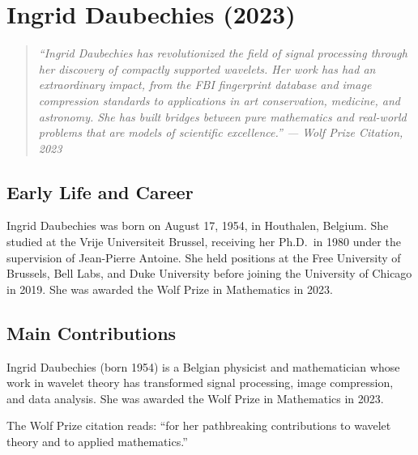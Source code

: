 \providecommand{\supp}{\operatorname{supp}}
\providecommand{\span}{\operatorname{span}}

\chapter{Ingrid Daubechies (2023)}

\begin{quote}
\it ``Ingrid Daubechies has revolutionized the field of signal processing through her discovery of compactly supported wavelets. Her work has had an extraordinary impact, from the FBI fingerprint database and image compression standards to applications in art conservation, medicine, and astronomy. She has built bridges between pure mathematics and real-world problems that are models of scientific excellence.'' --- Wolf Prize Citation, 2023
\end{quote}

\section{Early Life and Career}

Ingrid Daubechies was born on August 17, 1954, in Houthalen, Belgium. She studied at the Vrije Universiteit Brussel, receiving her Ph.D.\ in 1980 under the supervision of Jean-Pierre Antoine. She held positions at the Free University of Brussels, Bell Labs, and Duke University before joining the University of Chicago in 2019. She was awarded the Wolf Prize in Mathematics in 2023.

\section{Main Contributions}

Ingrid Daubechies (born 1954) is a Belgian physicist and mathematician whose work in wavelet theory has transformed signal processing, image compression, and data analysis. She was awarded the Wolf Prize in Mathematics in 2023.

The Wolf Prize citation reads: ``for her pathbreaking contributions to wavelet theory and to applied mathematics.''

